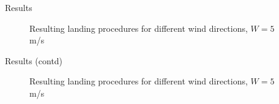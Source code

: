 \documentclass{beamer}
\begin{document}
\begin{frame}{Results}
    \begin{figure}
    
        \caption{Resulting landing procedures for different wind directions, $W=5$ m/s}
        \label{fig:result}
    \end{figure}
\end{frame}

\begin{frame}{Results (contd)}
    \begin{figure}
    
        \caption{Resulting landing procedures for different wind directions, $W=5$ m/s}
        \label{fig:result}
    \end{figure}
\end{frame}
\end{document}
